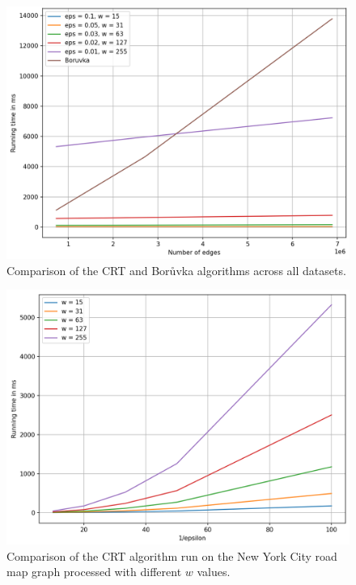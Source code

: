 \begin{figure}[H]
    \centering
    \includegraphics[width=1\linewidth]{figures/DifferentInputGraphs.png}
    \caption{Comparison of the CRT and Bor\r{u}vka algorithms across all datasets.}
    \label{fig:cmp}
\end{figure}
\FloatBarrier

\begin{figure}[H]
    \centering
    \includegraphics[width=0.9\linewidth]{figures/NYDifferentEpsilons.png}
    \caption{Comparison of the CRT algorithm run on the New York City road map graph processed with different $w$ values.}
    \label{fig:nyeps}
\end{figure}
\FloatBarrier

